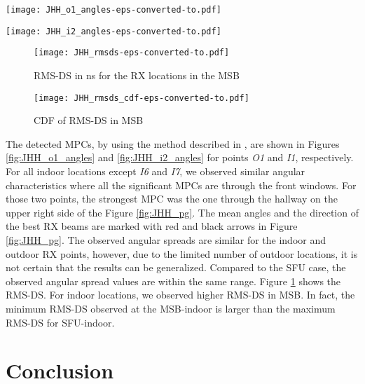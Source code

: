 \documentclass[conference]{IEEEtran}
\begin{document}
\begin{figure*}[tbp]
        \centering\texttt{[image: JHH\_o1\_angles-eps-converted-to.pdf]}\caption{Detected multipath components vs DoA - outdoor {\em O1} }\label{fig:JHH_o1_angles}
\end{figure*}

\begin{figure*}[tbp]
        \centering\texttt{[image: JHH\_i2\_angles-eps-converted-to.pdf]}\caption{Detected multi-path components vs DoA - indoor {\em I1}}\label{fig:JHH_i2_angles}
\end{figure*}


\begin{figure}[tbp]
        \centering\texttt{[image: JHH\_rmsds-eps-converted-to.pdf]}\caption{RMS-DS in ns for the RX locations in the MSB}\label{fig:JHH_rmsds}
\end{figure}

\begin{figure}[htbp]
        \centering\texttt{[image: JHH\_rmsds\_cdf-eps-converted-to.pdf]}\caption{CDF of RMS-DS in MSB}\label{fig:JHH_rmsds_cdf}
\end{figure}

The detected  MPCs, by using the method described in \cite{bas_realjournal_2017}, are shown in Figures \ref{fig:JHH_o1_angles} and \ref{fig:JHH_i2_angles} for points {\em O1} and {\em I1}, respectively. For all indoor locations except {\em I6} and {\em I7}, we observed similar angular characteristics where all the significant MPCs are through the front windows. For those two points, the strongest MPC was the one through the hallway on the upper right side of the Figure \ref{fig:JHH_pg}. The mean angles and the direction of the best RX beams are marked with red and black arrows in Figure \ref{fig:JHH_pg}. The observed angular spreads are similar for the indoor and outdoor RX points, however, due to the limited number of outdoor locations, it is not certain that the results can be generalized. Compared to the SFU case, the observed angular spread values are within the same range. Figure \ref{fig:JHH_rmsds} shows the RMS-DS. For indoor locations, we observed higher RMS-DS in MSB. In fact, the minimum RMS-DS observed at the MSB-indoor is larger than the maximum RMS-DS for SFU-indoor.



\section{Conclusion} \label{sec:conc}
\end{document}
